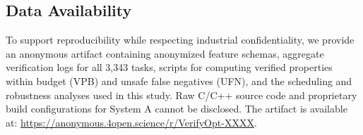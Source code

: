 \subsection*{Data Availability}
To support reproducibility while respecting industrial confidentiality, we provide an anonymous artifact containing anonymized feature schemas, aggregate verification logs for all 3,343 tasks, scripts for computing verified properties within budget (VPB) and unsafe false negatives (UFN), and the scheduling and robustness analyses used in this study. Raw C/C++ source code and proprietary build configurations for System A cannot be disclosed. The artifact is available at: \url{https://anonymous.4open.science/r/VerifyOpt-XXXX}.
